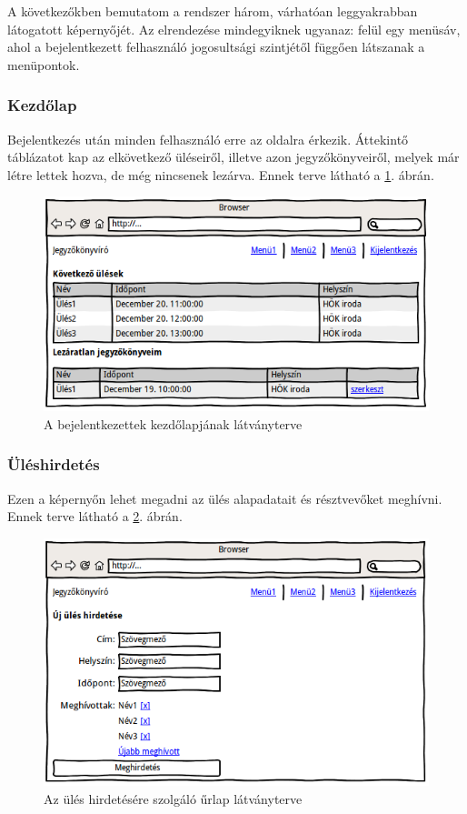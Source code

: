 \documentclass[a4paper,12pt,oneside]{report}
\begin{document}
A következőkben bemutatom a rendszer három, várhatóan leggyakrabban látogatott képernyőjét. Az elrendezése mindegyiknek ugyanaz: felül egy menüsáv, ahol a bejelentkezett felhasználó jogosultsági szintjétől függően látszanak a menüpontok.

\subsubsection{Kezdőlap}

Bejelentkezés után minden felhasználó erre az oldalra érkezik. Áttekintő táblázatot kap az elkövetkező üléseiről, illetve azon jegyzőkönyveiről, melyek már létre lettek hozva, de még nincsenek lezárva. Ennek terve látható a \ref{fig:wireframe-kezdolap}. ábrán.

\begin{figure}[h]
    \includegraphics[width=\textwidth]{wireframe-kezdolap}
    \caption{A bejelentkezettek kezdőlapjának látványterve}
    \label{fig:wireframe-kezdolap}
\end{figure}

\subsubsection{Üléshirdetés}

Ezen a képernyőn lehet megadni az ülés alapadatait és résztvevőket meghívni. Ennek terve látható a \ref{fig:wireframe-uleshirdetes}. ábrán.

\begin{figure}[h]
    \includegraphics[width=\textwidth]{wireframe-uleshirdetes}
    \caption{Az ülés hirdetésére szolgáló űrlap látványterve}
    \label{fig:wireframe-uleshirdetes}
\end{figure}
\end{document}
